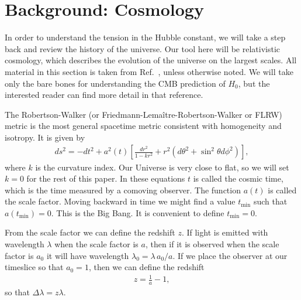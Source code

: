 \documentclass[12pt]{article}
\renewcommand{\th}[1]{\frac{1}{#1}}
\begin{document}
\section{Background: Cosmology} \label{sec:bac}

In order to understand the tension in the Hubble constant, we will take a step back and review the history of the universe.
Our tool here will be relativistic cosmology, which describes the evolution of the universe on the largest scales. All material in this section is taken from Ref.~\cite{Trodden2004}, unless otherwise noted. We will take only the bare bones for understanding the CMB prediction of $H_0$, but the interested reader can find more detail in that reference.

The Robertson-Walker (or Friedmann-Lemaître-Robertson-Walker or FLRW) metric is the most general spacetime metric consistent with homogeneity and isotropy. It is given by
\begin{align}
ds^2 = -dt^2 + a^2(t)\left[\frac{dr^2}{1-kr^2} + r^2 (d\theta^2 + \sin^2 \theta d\phi^2)\right],
\end{align}
where
$k$
is the curvature index. 
Our Universe is very close to flat, so we will set $k=0$ for the rest of this paper.
In these equations $t$ is called the cosmic time, which is the time measured by a comoving observer. The function $a(t)$ is called the scale factor. Moving backward in time we might find a value $t_\text{min}$ such that $a(t_\text{min})=0$. This is the Big Bang. It is convenient to define $t_\text{min} = 0$.

From the scale factor we can define the redshift $z$. If light is emitted with wavelength $\lambda$ when the scale factor is $a$, then if it is observed when the scale factor is $a_0$ it will have wavelength $\lambda_0 = \lambda\, a_0/a$. If we place the observer at our timeslice so that $a_0=1$, then we can define the redshift
\begin{align}
z = \th{a}-1, \label{eqn:redshift}
\end{align}
so that $\Delta\lambda = z\lambda$.
\end{document}
